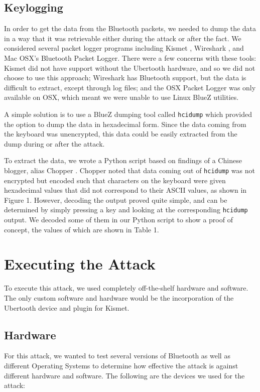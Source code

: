 \documentclass{acm_proc_article-sp}
\begin{document}
\subsection{Keylogging}
In order to get the data from the Bluetooth packets, we needed to dump the data in a way that it was retrievable either during the attack or after the fact. We considered several packet logger programs including Kismet \cite{kismet}, Wireshark \cite{wireshark}, and Mac OSX's Bluetooth Packet Logger. There were a few concerns with these tools: Kismet did not have support without the Ubertooth hardware, and so we did not choose to use this approach; Wireshark has Bluetooth support, but the data is difficult to extract, except through log files; and the OSX Packet Logger was only available on OSX, which meant we were unable to use Linux BlueZ utilities. 

A simple solution is to use a BlueZ dumping tool called \texttt{hcidump} which provided the option to dump the data in hexadecimal form. Since the data coming from the keyboard was unencrypted, this data could be easily extracted from the dump during or after the attack. 

To extract the data, we wrote a Python script based on findings of a Chinese blogger, alias Chopper \cite{chopper}. Chopper noted that data coming out of \texttt{hcidump} was not encrypted but encoded such that characters on the keyboard were given hexadecimal values that did not correspond to their ASCII values, as shown in Figure 1. However, decoding the output proved quite simple, and can be determined by simply pressing a key and looking at the corresponding \texttt{hcidump} output. We decoded some of them in our Python script to show a proof of concept, the values of which are shown in Table 1.

\section{Executing the Attack}
To execute this attack, we used completely off-the-shelf hardware and software. The only custom software and hardware would be the incorporation of the Ubertooth device and plugin for Kismet. 

\subsection{Hardware}
For this attack, we wanted to test several versions of Bluetooth as well as different Operating Systems to determine how effective the attack is against different hardware and software. The following are the devices we used for the attack:
\end{document}

